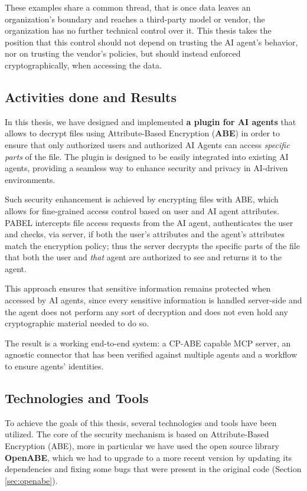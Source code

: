 These examples share a common thread, that is once data leaves an organization's boundary and reaches a third-party model or vendor, the organization has no further technical control over it. This thesis takes the position that this control should not depend on trusting the AI agent's behavior, nor on trusting the vendor's policies, but should instead enforced cryptographically, when accessing the data.
\subsection{Activities done and Results}
In this thesis, we have designed and implemented \textbf{a plugin for AI agents} that allows to decrypt files using Attribute-Based Encryption (\textbf{ABE}) in order to ensure that only authorized users and authorized AI Agents can access \emph{specific parts} of the file. The plugin is designed to be easily integrated into existing AI agents, providing a seamless way to enhance security and privacy in AI-driven environments.

Such security enhancement is achieved by encrypting files with ABE, which allows for fine-grained access control based on user and AI agent attributes. PABEL intercepts file access requests from the AI agent, authenticates the user and checks, via server, if both the user's attributes and the agent's attributes match the encryption policy; thus the server decrypts the specific parts of the file that both the user and \emph{that} agent are authorized to see and returns it to the agent.

This approach ensures that sensitive information remains protected when accessed by AI agents, since every sensitive information is handled server-side and the agent does not perform any sort of decryption and does not even hold any cryptographic material needed to do so.

The result is a working end-to-end system: a CP-ABE capable MCP server, an agnostic connector that has been verified against multiple agents and a workflow to ensure agents' identities.
\subsection{Technologies and Tools}
To achieve the goals of this thesis, several technologies and tools have been utilized.
The core of the security mechanism is based on Attribute-Based Encryption (ABE), more in particular we have used the open source library \textbf{OpenABE}\cite{openabe}, which we had to upgrade to a more recent version by updating its dependencies and fixing some bugs that were present in the original code (Section \ref{sec:openabe}).

